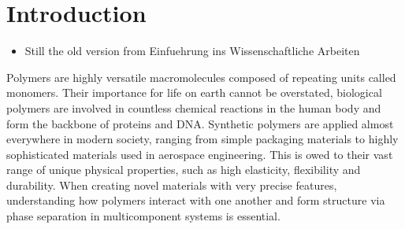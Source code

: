 \documentclass[bachelor,       %
               twoside,        %
               BCOR10mm,       %
               ngerman, english %
               ]{GAUBM}
\begin{document}
\chapter{Introduction}
\begin{itemize}
    \item Still the old version from Einfuehrung ins Wissenschaftliche Arbeiten
\end{itemize}
Polymers are highly versatile macromolecules composed of repeating units called monomers. Their importance for life on earth cannot be overstated, biological polymers are involved in countless chemical reactions in the human body and form the backbone of proteins and DNA. Synthetic polymers are applied almost everywhere in modern society, ranging from simple packaging materials to highly sophisticated materials used in aerospace engineering. This is owed to their vast range of unique physical properties, such as high elasticity, flexibility and durability. When creating novel materials with very precise features, understanding how polymers interact with one another and form structure via phase separation in multicomponent systems is essential.\\
\end{document}
